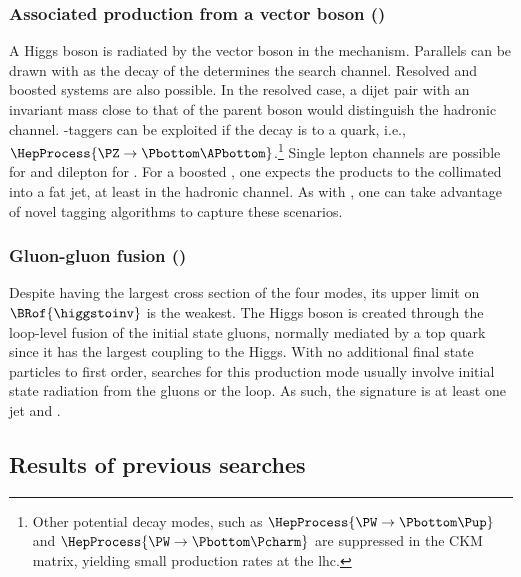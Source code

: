 

\subsubsection{Associated production from a vector boson (\texorpdfstring{\VH}{VH})}
\label{subsubsec:theory_hinv_VH_mode}

A Higgs boson is radiated by the vector boson \PVec in the \VH mechanism. Parallels can be drawn with \ttH as the decay of the \PVec determines the search channel. Resolved and boosted systems are also possible. In the resolved case, a dijet pair with an invariant mass close to that of the parent boson would distinguish the hadronic channel. \Pbottom-taggers can be exploited if the decay is to a \Pbottom quark, i.e., $\HepProcess{\PZ \to \Pbottom\APbottom}$.\footnote{Other potential decay modes, such as $\HepProcess{\PW \to \Pbottom\Pup}$ and $\HepProcess{\PW \to \Pbottom\Pcharm}$ are suppressed in the CKM matrix, yielding small production rates at the \acrshort{lhc}.} Single lepton channels are possible for \WH and dilepton for \ZH. For a boosted \PVec, one expects the products to the collimated into a fat \gls{jet}, at least in the hadronic channel. As with \ttH, one can take advantage of novel tagging algorithms to capture these scenarios. 




\subsubsection{Gluon-gluon fusion (\texorpdfstring{\ggH}{ggH})}
\label{subsubsec:theory_hinv_ggF_mode}

Despite \ggH having the largest cross section of the four modes, its upper limit on $\BRof{\higgstoinv}$ is the weakest. The Higgs boson is created through the loop-level fusion of the initial state gluons, normally mediated by a top quark since it has the largest coupling to the Higgs. With no additional final state particles to first order, searches for this production mode usually involve initial state radiation from the gluons or the loop. As such, the signature is at least one \gls{jet} and \ptvecmiss.




\subsection{Results of previous searches}
\label{subsec:theory_hinv_prev_results}


